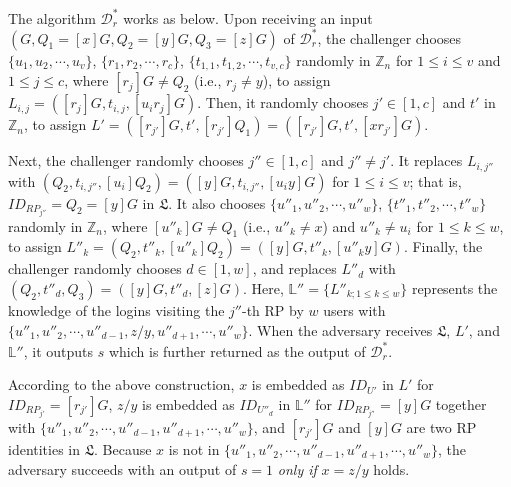 %
The algorithm $\mathcal{D}^*_r$ works as below.
Upon receiving an input $(G, Q_1=[x]G, Q_2=[y]G, Q_3=[z]G)$ of $\mathcal{D}^*_r$,
 the challenger chooses
 $\{u_1, u_2, \cdots, u_v\}$, $\{r_1, r_2, \cdots, r_c\}$, $\{t_{1, 1}, t_{1, 2}, \cdots, t_{v, c}\}$ randomly in $\mathbb{Z}_n$ for $1 \le i \le v$ and $1 \le j \le c$,
  where $[r_{j}]G \neq Q_2$ (i.e., $r_j \neq y$),
  to assign $L_{i, j}=([r_j]G, t_{i,j}, [u_ir_j]G)$.
Then,
 it randomly chooses $j' \in [1, c]$ and $t'$ in $\mathbb{Z}_n$, to assign $L' = ([r_{j'}]G, t', [r_{j'}]Q_1) = ([r_{j'}]G, t', [xr_{j'}]G)$.

Next, the challenger randomly chooses $j'' \in [1, c]$ and $j'' \neq j'$.
It replaces $L_{i, j''}$ with $(Q_2, t_{i,j''}, [u_i]Q_2) = ([y]G, t_{i,j''}, [u_iy]G)$ for $1 \leq i \leq v$;
that is, $ID_{RP_{j''}} = Q_2 = [y]G$ in $\mathfrak{L}$.
It also chooses $\{u''_1, u''_2, \cdots, u''_w\}$, $\{t''_1, t''_2, \cdots, t''_w\}$ randomly in $\mathbb{Z}_n$,
    where $[u''_k]G \neq Q_1$ (i.e., $u''_k \neq x$) and $u''_k \neq u_i$ for $1 \leq k \leq w$,
    to assign $L''_k = (Q_2, t''_k, [u''_k]Q_2) = ([y]G, t''_k, [u''_ky]G)$.
Finally,
the challenger randomly chooses $d \in [1, w]$, and replaces $L''_d$ with $(Q_2, t''_d, Q_3) = ([y]G, t''_d, [z]G)$.
Here, $\mathbb{L}'' = \{L''_{k; 1 \leq k \leq w}\}$ represents the knowledge of the logins
        visiting the $j''$-th RP %
         by
    $w$ users with $\{u''_1, u''_2, \cdots, u''_{d-1}, z/y, u''_{d+1}, \cdots, u''_w\}$.
When the adversary receives $\mathfrak{L}$, $L'$, and $\mathbb{L}''$,
 it outputs $s$ which is further returned as the output of $\mathcal{D}^*_r$.

According to the above construction, %
 $x$ is embedded as $ID_{U'}$ in $L'$ for $ID_{RP_{j'}} = [r_{j'}]G$,
 $z/y$ is embedded as $ID_{U''_d}$ in $\mathbb{L}''$ for $ID_{RP_{j''}} = [y]G$ together with $\{u''_1, u''_2, \cdots, u''_{d-1}, u''_{d+1}, \cdots, u''_w\}$, and $[r_{j'}]G$ and $[y]G$ are two RP identities in $\mathfrak{L}$.
Because $x$ is not in $\{u''_1, u''_2, \cdots, u''_{d-1}, u''_{d+1}, \cdots, u''_w\}$,
    the adversary succeeds with an output of $s=1$
     \emph{only if} $x = z/y$ holds.


